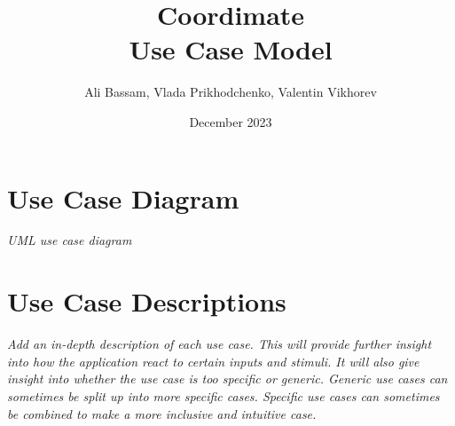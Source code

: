\documentclass{article}
\title{Coordimate\\Use Case Model}
\date{December 2023}
\author{Ali Bassam, Vlada Prikhodchenko, Valentin Vikhorev}
\begin{document}
\maketitle

\section{Use Case Diagram}

\textit{UML use case diagram }

\section{Use Case Descriptions}

\textit{Add an in-depth description of each use case.
This will provide further insight into how the application react to certain
inputs and stimuli. It will also give insight into whether the use case is too
specific or generic. Generic use cases can sometimes be split up into more
specific cases. Specific use cases can sometimes be combined to make a more
inclusive and intuitive case.}
\end{document}
